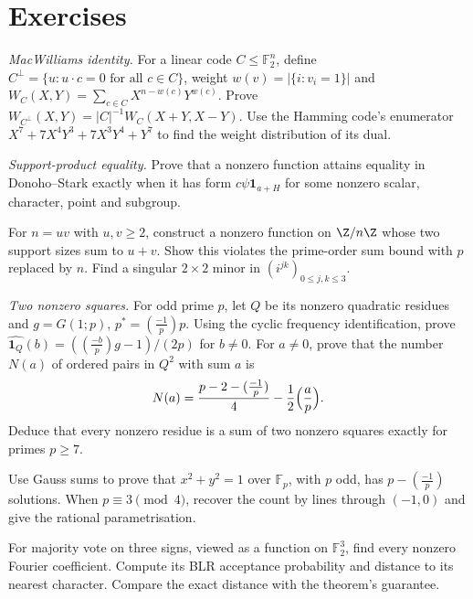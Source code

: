 \section{Exercises}

\begin{exercise}[$\star\star$]\label{ex:macwilliams}
\emph{MacWilliams identity.} For a linear code $C\le\mathbb F_2^n$, define $C^\perp=\{u:u\cdot c=0\text{ for all }c\in C\}$, weight $w(v)=|\{i:v_i=1\}|$ and $W_C(X,Y)=\sum_{c\in C}X^{n-w(c)}Y^{w(c)}$. Prove
$W_{C^\perp}(X,Y)=|C|^{-1}W_C(X+Y,X-Y)$.
Use the Hamming code's enumerator $X^7+7X^4Y^3+7X^3Y^4+Y^7$ to find the weight distribution of its dual.
\end{exercise}
\begin{exercise}[$\star\star$]\label{ex:dsequality}
\emph{Support-product equality.} Prove that a nonzero function attains equality in Donoho--Stark exactly when it has form $c\psi\mathbf1_{a+H}$ for some nonzero scalar, character, point and subgroup.
\end{exercise}
\begin{exercise}[$\star$]\label{ex:composite}
For $n=uv$ with $u,v\ge2$, construct a nonzero function on $\Z/n\Z$ whose two support sizes sum to $u+v$. Show this violates the prime-order sum bound with $p$ replaced by $n$. Find a singular $2\times2$ minor in $(i^{jk})_{0\le j,k\le3}$.
\end{exercise}
\begin{exercise}[$\star\star$]\label{ex:qrsums}
\emph{Two nonzero squares.} For odd prime $p$, let $Q$ be its nonzero quadratic residues and $g=G(1;p)$, $p^*=(\frac{-1}p)p$. Using the cyclic frequency identification, prove
$\widehat{\mathbf1_Q}(b)=((\frac{-b}p)g-1)/(2p)$ for $b\ne0$.
For $a\ne0$, prove that the number $N(a)$ of ordered pairs in $Q^2$ with sum $a$ is
\[
N(a)=\frac{p-2-(\frac{-1}p)}4-\frac12\Bigl(\frac ap\Bigr).
\]
Deduce that every nonzero residue is a sum of two nonzero squares exactly for primes $p\ge7$.
\end{exercise}
\begin{exercise}[$\star\star$]\label{ex:circlefp}
Use Gauss sums to prove that $x^2+y^2=1$ over $\mathbb F_p$, with $p$ odd, has $p-(\frac{-1}p)$ solutions. When $p\equiv3\pmod4$, recover the count by lines through $(-1,0)$ and give the rational parametrisation.
\end{exercise}
\begin{exercise}[$\star$]\label{ex:majority}
For majority vote on three signs, viewed as a function on $\mathbb F_2^3$, find every nonzero Fourier coefficient. Compute its BLR acceptance probability and distance to its nearest character. Compare the exact distance with the theorem's guarantee.
\end{exercise}
